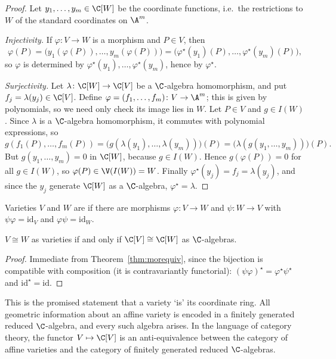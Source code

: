 \begin{proof}
	Let $y_1,\dots,y_m \in \C[W]$ be the coordinate functions, i.e.\ the restrictions to $W$ of the standard coordinates on $\A^m$.

	\emph{Injectivity.} If $\varphi \colon V \to W$ is a morphism and $P \in V$, then
	$$\varphi(P) = \big(y_1(\varphi(P)),\dots,y_m(\varphi(P))\big) = \big(\varphi^\star(y_1)(P),\dots,\varphi^\star(y_m)(P)\big),$$
	so $\varphi$ is determined by $\varphi^\star(y_1),\dots,\varphi^\star(y_m)$, hence by $\varphi^\star$.

	\emph{Surjectivity.} Let $\lambda \colon \C[W] \to \C[V]$ be a $\C$-algebra homomorphism, and put $f_j = \lambda(y_j) \in \C[V]$. Define $\varphi = (f_1,\dots,f_m) \colon V \to \A^m$; this is given by polynomials, so we need only check its image lies in $W$. Let $P \in V$ and $g \in I(W)$. Since $\lambda$ is a $\C$-algebra homomorphism, it commutes with polynomial expressions, so
	$$g(f_1(P),\dots,f_m(P)) = \big(g(\lambda(y_1),\dots,\lambda(y_m))\big)(P) = \big(\lambda(g(y_1,\dots,y_m))\big)(P).$$
	But $g(y_1,\dots,y_m) = 0$ in $\C[W]$, because $g \in I(W)$. Hence $g(\varphi(P)) = 0$ for all $g \in I(W)$, so $\varphi(P) \in \V(I(W)) = W$. Finally $\varphi^\star(y_j) = f_j = \lambda(y_j)$, and since the $y_j$ generate $\C[W]$ as a $\C$-algebra, $\varphi^\star = \lambda$.
\end{proof}

\begin{definition}[Isomorphism]
	Varieties $V$ and $W$ are  if there are morphisms $\varphi \colon V \to W$ and $\psi \colon W \to V$ with $\psi\varphi = \mathrm{id}_V$ and $\varphi\psi = \mathrm{id}_W$.
\end{definition}

\begin{corollary}\label{cor:isocoord}
	$V \cong W$ as varieties if and only if $\C[V] \cong \C[W]$ as $\C$-algebras.
\end{corollary}

\begin{proof}
	Immediate from Theorem~\ref{thm:morequiv}, since the bijection is compatible with composition (it is contravariantly functorial): $(\psi\varphi)^\star = \varphi^\star\psi^\star$ and $\mathrm{id}^\star = \mathrm{id}$.
\end{proof}

This is the promised statement that a variety `is' its coordinate ring. All geometric information about an affine variety is encoded in a finitely generated reduced $\C$-algebra, and every such algebra arises. In the language of category theory, the functor $V \mapsto \C[V]$ is an anti-equivalence between the category of affine varieties and the category of finitely generated reduced $\C$-algebras.

